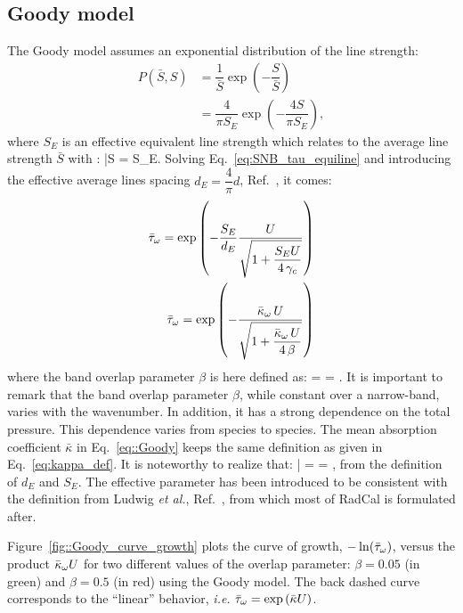\subsection{Goody model}\label{sec:goody_model}

The Goody model assumes an exponential distribution of the line strength:
\begin{align}
 P(\bar{S},S) &= \dfrac{1}{\bar{S}}\exp\left(-\dfrac{S}{\bar{S}} \right) \\
              &= \dfrac{4}{\pi S_E}\exp\left(-\dfrac{4S}{\pi S_E} \right),
\end{align}
where $S_E$ is an effective equivalent line strength which relates to the average line strength $\bar{S}$ with \cite{Malkmus1967,Ludwig1973}:
\be\label{eq::S_E_barS}
\bar{S} =  S_E.
\ee
Solving Eq.~\ref{eq:SNB_tau_equiline} and introducing the effective average lines spacing $d_E = \dfrac{4}{\pi}d$, Ref.~\cite{Malkmus1967}, it comes:
\begin{align}\label{eq::Goody}
    \bar{\tau}_{\omega} = \exp\left(-\dfrac{S_E}{d_E} \dfrac{U}{\displaystyle \sqrt{1+\frac{S_E U}{4 \, \gamma_c }}}\right) \nonumber \\
    \bar{\tau}_{\omega} = \exp\left(-\frac{\bar{\kappa}_{\omega} \, U} {\displaystyle \sqrt{1+\frac{\bar{\kappa}_{\omega} \, U}{4 \, \beta}}}\right)
\end{align}
where the band overlap parameter $\beta$ is here defined as:
\be
\beta =  = .
\ee
It is important to remark that the band overlap parameter $\beta$, while constant over a narrow-band, varies with the wavenumber. In addition, it has a strong dependence on the total pressure. This dependence varies from species to species. The mean absorption coefficient $\bar{\kappa}$ in Eq.~\ref{eq::Goody} keeps the same definition as given in Eq.~\ref{eq:kappa_def}. It is noteworthy to realize that:
\be
\bar{\kappa} =  = ,
\ee
from the definition of $d_E$ and $S_E$. The effective parameter has been introduced to be consistent with the definition from Ludwig \textit{et al.}, Ref.~\cite{Ludwig1973}, from which most of RadCal is formulated after.

Figure~\ref{fig::Goody_curve_growth} plots the curve of growth, $-\ln(\bar{\tau}_{\omega})$, versus the product $\bar{\kappa}_{\omega} U$ for two different values of the overlap parameter: $\beta = 0.05$ (in green) and $\beta = 0.5$ (in red) using the Goody model. The back dashed curve corresponds to the ``linear'' behavior, \textit{i.e.} $\bar{\tau}_{\omega} = \exp\left(\bar{\kappa} U\right)$.

